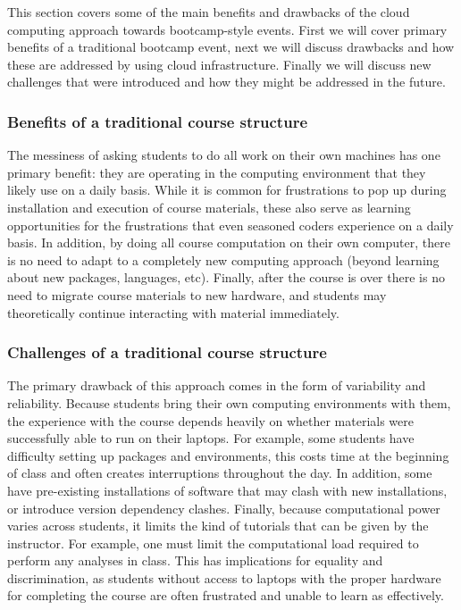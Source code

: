 This section covers some of the main benefits and drawbacks of the cloud
computing approach towards bootcamp-style events. First we will cover primary
benefits of a traditional bootcamp event, next we will discuss drawbacks and how
these are addressed by using cloud infrastructure. Finally we will discuss new
challenges that were introduced and how they might be addressed in the future.

\subsubsection{Benefits of a traditional course structure}

The messiness of asking students to do all work on their own machines has one
primary benefit: they are operating in the computing environment that they
likely use on a daily basis. While it is common for frustrations to pop up
during installation and execution of course materials, these also serve as
learning opportunities for the frustrations that even seasoned coders experience
on a daily basis. In addition, by doing all course computation on their own
computer, there is no need to adapt to a completely new computing approach
(beyond learning about new packages, languages, etc). Finally, after the course
is over there is no need to migrate course materials to new hardware, and
students may theoretically continue interacting with material immediately.

\subsubsection{Challenges of a traditional course structure}

The primary drawback of this approach comes in the form of variability and
reliability. Because students bring their own computing environments with them,
the experience with the course depends heavily on whether materials were
successfully able to run on their laptops. For example, some students have
difficulty setting up packages and environments, this costs time at the
beginning of class and often creates interruptions throughout the day. In
addition, some have pre-existing installations of software that may clash with
new installations, or introduce version dependency clashes. Finally, because
computational power varies across students, it limits the kind of tutorials that
can be given by the instructor. For example, one must limit the computational
load required to perform any analyses in class. This has implications for
equality and discrimination, as students without access to laptops with the
proper hardware for completing the course are often frustrated and unable to
learn as effectively.

